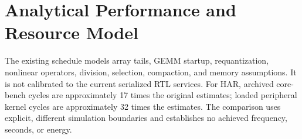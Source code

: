\section{Analytical Performance and Resource Model}
\label{sec:model}
The existing schedule models array tails, GEMM startup, requantization,
nonlinear operators, division, selection, compaction, and memory assumptions.
It is not calibrated to the current serialized RTL services. For HAR, archived
core-bench cycles are approximately 17 times the original estimates; loaded
peripheral kernel cycles are approximately 32 times the estimates. The
comparison uses explicit, different simulation boundaries and establishes no
achieved frequency, seconds, or energy.

